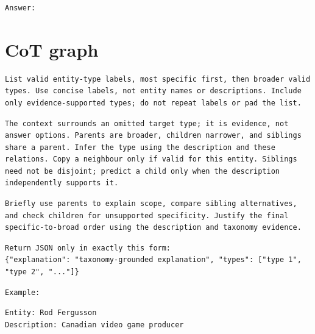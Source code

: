 \begin{Verbatim}[fontsize=\footnotesize,breaklines=true,breakanywhere=true]
Answer:
\end{Verbatim}

\clearpage

\section{CoT graph}

\begin{Verbatim}[fontsize=\footnotesize,breaklines=true,breakanywhere=true]
List valid entity-type labels, most specific first, then broader valid types. Use concise labels, not entity names or descriptions. Include only evidence-supported types; do not repeat labels or pad the list.
\end{Verbatim}

\begin{Verbatim}[fontsize=\footnotesize,breaklines=true,breakanywhere=true]
The context surrounds an omitted target type; it is evidence, not answer options. Parents are broader, children narrower, and siblings share a parent. Infer the type using the description and these relations. Copy a neighbour only if valid for this entity. Siblings need not be disjoint; predict a child only when the description independently supports it.
\end{Verbatim}

\begin{Verbatim}[fontsize=\footnotesize,breaklines=true,breakanywhere=true]
Briefly use parents to explain scope, compare sibling alternatives, and check children for unsupported specificity. Justify the final specific-to-broad order using the description and taxonomy evidence.
\end{Verbatim}

\begin{Verbatim}[fontsize=\footnotesize,breaklines=true,breakanywhere=true]
Return JSON only in exactly this form:
{"explanation": "taxonomy-grounded explanation", "types": ["type 1", "type 2", "..."]}
\end{Verbatim}

\begin{Verbatim}[fontsize=\footnotesize,breaklines=true,breakanywhere=true]
Example:
\end{Verbatim}

\begin{Verbatim}[fontsize=\footnotesize,breaklines=true,breakanywhere=true]
Entity: Rod Fergusson
Description: Canadian video game producer
\end{Verbatim}

